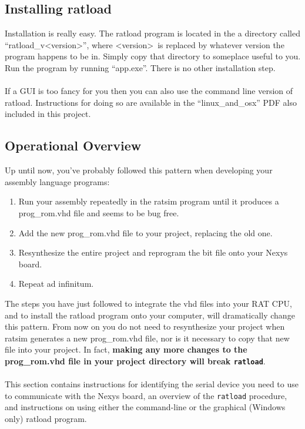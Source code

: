 \documentclass[notitlepage]{article}
\begin{document}
\subsection{Installing ratload}
Installation is really easy. The ratload program is located in the a directory called ``ratload\_v{\textless}version\textgreater'', where {\textless}version\textgreater~is replaced by whatever version the program happens to be in. Simply copy that directory to someplace useful to you. Run the program by running ``app.exe''. There is no other installation step.\\\\
If a GUI is too fancy for you then you can also use the command line version of ratload. Instructions for doing so are available in the ``linux\_and\_osx'' PDF also included in this project.

\subsection{Operational Overview}
Up until now, you've probably followed this pattern when developing your assembly language programs:
\begin{enumerate}
\item Run your assembly repeatedly in the ratsim program until it produces a prog\_rom.vhd file and seems to be bug free.
\item Add the new prog\_rom.vhd file to your project, replacing the old one.
\item Resynthesize the entire project and reprogram the bit file onto your Nexys board.
\item Repeat ad infinitum.
\end{enumerate}
The steps you have just followed to integrate the vhd files into your RAT CPU, and to install the ratload program onto your computer, will dramatically change this pattern. From now on you do not need to resynthesize your project when ratsim generates a new prog\_rom.vhd file, nor is it necessary to copy that new file into your project. In fact, \textbf{making any more changes to the prog\_rom.vhd file in your project directory will break \texttt{ratload}}.\\\\
This section contains instructions for identifying the serial device you need to use to communicate with the Nexys board, an overview of the \texttt{ratload} procedure, and instructions on using either the command-line or the graphical (Windows only) ratload program.
\end{document}
